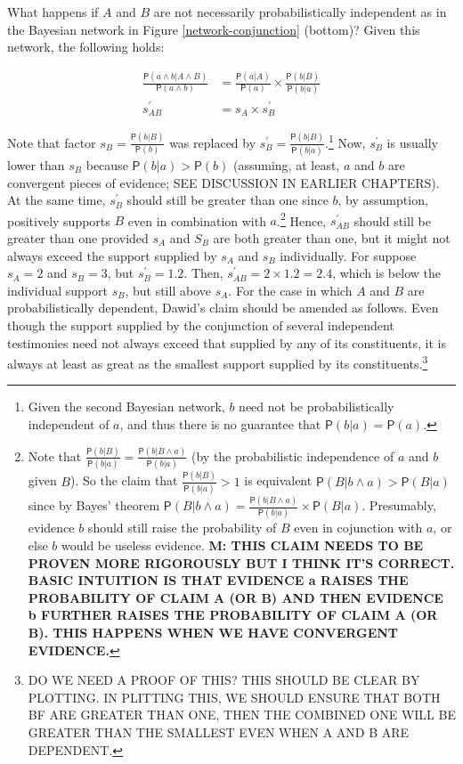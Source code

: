 \documentclass[10pt,dvipsnames,enabledeprecatedfontcommands]{scrartcl}
\newcommand{\pr}[1]{\mathsf{P}(#1)}
\begin{document}
What happens if \(A\) and \(B\) are not necessarily probabilistically
independent as in the Bayesian network in Figure
\ref{network-conjunction} (bottom)? Given this network, the following
holds:

\begin{align*}
\frac{\pr{a \wedge b| A\wedge B}}{\pr{a \wedge b}} & =  \frac{\pr{a |A}}{\pr{a}} \times \frac{\pr{b |B}}{\pr{b|a}} \\
s^{'}_{AB}& =  s_{A}\times s^{'}_{B} 
 \end{align*}

\noindent  Note that factor \(s_{B}= \frac{\pr{b |B}}{\pr{b}}\) was
replaced by
\(s^{'}_{B}=\frac{\pr{b |B}}{\pr{b|a}}\).\footnote{Given the second Bayesian network, 
$b$ need not be probabilistically independent of $a$, and thus there is no guarantee that 
$\pr{b \vert a}=\pr{a}$.} Now, \(s^{'}_{B}\) is usually lower than
\(s_{B}\) because \(\pr{b | a} > \pr{b}\) (assuming, at least, \(a\) and
\(b\) are convergent pieces of evidence; SEE DISCUSSION IN EARLIER
CHAPTERS). At the same time, \(s^{'}_{B}\) should still be greater than
one since \(b\), by assumption, positively supports \(B\) even in
combination with \(a\).\footnote{Note that 
$\frac{\pr{b |B}}{\pr{b|a}}=\frac{\pr{b |B \wedge a}}{\pr{b|a}}$ 
(by the probabilistic independence of $a$ and $b$ given $B$). 
So the claim that $\frac{\pr{b |B}}{\pr{b|a}}>1$ is 
equivalent $\pr{B | b \wedge a}> \pr{B|a}$ since by Bayes' theorem 
$\pr{B | b \wedge a} = \frac{\pr{b |B \wedge a}}{\pr{b|a}} \times \pr{B|a}$.
Presumably, evidence $b$ should still raise the probability of $B$ 
even in cojunction with $a$, or else $b$ would be useless evidence. \textbf{M: THIS CLAIM NEEDS 
TO BE PROVEN MORE RIGOROUSLY BUT I THINK IT'S CORRECT. BASIC INTUITION IS THAT EVIDENCE a 
RAISES THE PROBABILITY OF CLAIM A (OR B) AND THEN EVIDENCE 
b FURTHER RAISES THE PROBABILITY OF CLAIM A (OR B). THIS HAPPENS WHEN WE HAVE CONVERGENT 
EVIDENCE.}} Hence, \(s^{'}_{AB}\) should still be greater than one
provided \(s_A\) and \(S_B\) are both greater than one, but it might not
always exceed the support supplied by \(s_A\) and \(s_B\) individually.
For suppose \(s_A=2\) and \(s_B=3\), but \(s^{'}_B=1.2\). Then,
\(s^{'}_{AB}=2\times 1.2=2.4\), which is below the individual support
\(s_B\), but still above \(s_A\). For the case in which \(A\) and \(B\)
are probabilistically dependent, Dawid's claim should be amended as
follows. Even though the support supplied by the conjunction of several
independent testimonies need not always exceed that supplied by any of
its constituents, it is always at least as great as the smallest support
supplied by its
constituents.\footnote{DO WE NEED A PROOF OF THIS? THIS SHOULD BE CLEAR BY PLOTTING. IN PLITTING THIS, WE SHOULD ENSURE THAT BOTH BF ARE GREATER THAN ONE, THEN THE COMBINED ONE WILL BE GREATER THAN THE SMALLEST EVEN WHEN A AND B ARE DEPENDENT.}
\end{document}
